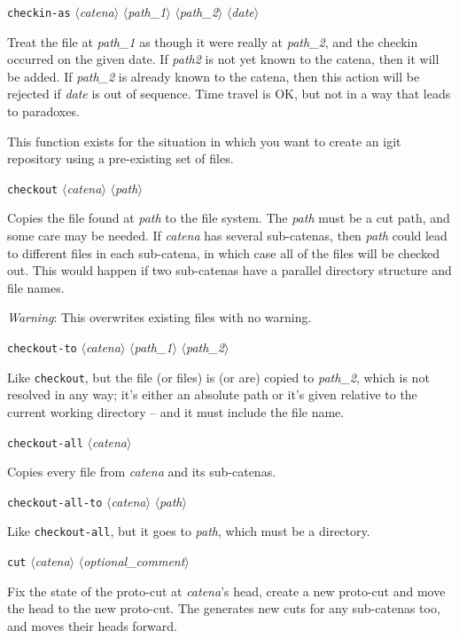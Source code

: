 \documentclass[10pt]{article}
\newcommand{\itarg}[1]{\textit{$\langle$#1$\rangle$}}
\begin{document}
{{\tt checkin-as} \itarg{catena} \itarg{path\_1} \itarg{path\_2} \itarg{date}
\begin{hang}
Treat the file at {\it path\_1} as though it were really at {\it path\_2},
and the checkin occurred on the given date. If {\it path2} is not yet
known to the catena, then it will be added. If {\it path\_2} is already
known to the catena, then this action will be rejected if {\it date}
is out of sequence. Time travel is OK, but not in a way that leads to
paradoxes. 
  
This function exists for the situation in which you want to create
an igit repository using a pre-existing set of files.
\end{hang}
\pagebreak
{\tt checkout} \itarg{catena} \itarg{path}
\begin{hang}
Copies the file found at {\it path} to the file system.
The {\it path} must be a cut path, and some care may be needed. If
{\it catena} has several sub-catenas, then {\it path} could lead to
different files in each sub-catena, in which case all of the files
will be checked out. This would happen if two sub-catenas have a
parallel directory structure and file names.

{\it Warning}: This overwrites existing files with no
warning.
\end{hang}    

{\tt checkout-to} \itarg{catena} \itarg{path\_1} \itarg{path\_2}
\begin{hang}
Like {\tt checkout}, but the file (or files) is (or are) copied to
{\it path\_2}, which is not resolved in any way; it's either an absolute
path or it's given relative to the current working
directory -- and it must include the file name.
\end{hang}

{\tt checkout-all} \itarg{catena}
\begin{hang}
Copies every file from {\it catena} and its sub-catenas.
\end{hang}
 
{\tt checkout-all-to} \itarg{catena} \itarg{path}
\begin{hang}
Like {\tt checkout-all}, but it goes to {\it path}, which must be a
directory. 
\end{hang}

{\tt cut} \itarg{catena} \itarg{optional\_comment}
\begin{hang}
Fix the state of the proto-cut at {\it catena}'s head, create a new
proto-cut and move the head to the new proto-cut. The generates new
cuts for any sub-catenas too, and moves their heads forward.
  

\end{hang}}
\end{document}
